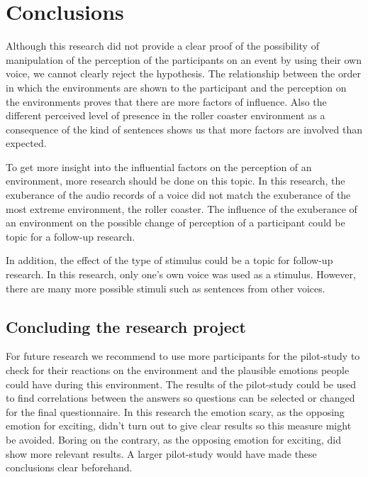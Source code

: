 \documentclass[Case_Study.tex]{subfiles}
\begin{document}
\chapter{Conclusions}

Although this research did not provide a clear proof of the possibility of manipulation of the perception of the participants on an event by using their own voice, we cannot clearly reject the hypothesis. The relationship between the order in which the environments are shown to the participant and the perception on the environments proves that there are more factors of influence. Also the different perceived level of presence in the roller coaster environment as a consequence of the kind of sentences shows us that more factors are involved than expected.

To get more insight into the influential factors on the perception of an environment, more research should be done on this topic. In this research, the exuberance of the audio records of a voice did not match the exuberance of the most extreme environment, the roller coaster. The influence of the exuberance of an environment on the possible change of perception of a participant could be topic for a follow-up research.

In addition, the effect of the type of stimulus could be a topic for follow-up research. In this research, only one's own voice was used as a stimulus. However, there are many more possible stimuli such as sentences from other voices. 

\section{Concluding the research project}
For future research we recommend to use more participants for the pilot-study to check for their reactions on the environment and the plausible emotions people could have during this environment. The results of the pilot-study could be used to find correlations between the answers so questions can be selected or changed for the final questionnaire. In this research the emotion scary, as the opposing emotion for exciting, didn't turn out to give clear results so this measure might be avoided. Boring on the contrary, as the opposing emotion for exciting, did show more relevant results. A larger pilot-study would have made these conclusions clear beforehand.  
\end{document}

